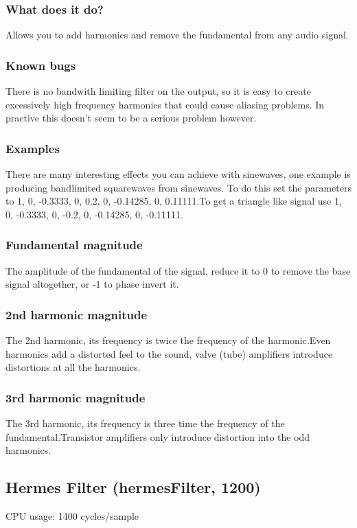 \documentclass[11pt]{article}
\begin{document}
\subsubsection{What does it do?}Allows you to add harmonics and remove the fundamental from any audio signal.\subsubsection{Known bugs}There is no bandwith limiting filter on the output, so it is easy to create excessively high frequency harmonics that could cause aliasing problems. In practive this doesn't seem to be a serious problem however.\subsubsection{Examples}There are many interesting effects you can achieve with sinewaves, one example is producing bandlimited squarewaves from sinewaves. To do this set the parameters to 1, 0, -0.3333, 0, 0.2, 0, -0.14285, 0, 0.11111.To get a triangle like signal use 1, 0, -0.3333, 0, -0.2, 0, -0.14285, 0, -0.11111.\subsubsection*{Fundamental magnitude}
The amplitude of the fundamental of the signal, reduce it to 0 to remove the base signal altogether, or -1 to phase invert it.\subsubsection*{2nd harmonic magnitude}
The 2nd harmonic, its frequency is twice the frequency of the harmonic.Even harmonics add a distorted feel to the sound, valve (tube) amplifiers introduce distortions at all the harmonics.\subsubsection*{3rd harmonic magnitude}
The 3rd harmonic, its frequency is three time the frequency of the fundamental.Transistor amplifiers only introduce distortion into the odd harmonics.\subsection{Hermes Filter (hermesFilter, 1200)\label{hermesFilter}\label{id1200}}
CPU usage: 1400 cycles/sample
\end{document}
